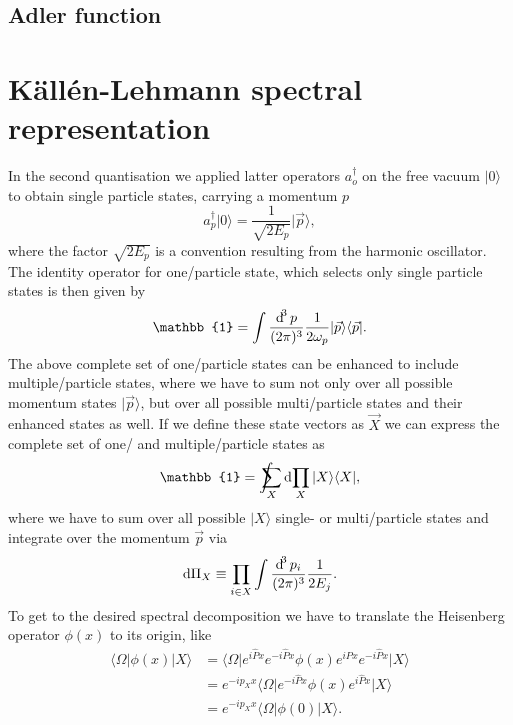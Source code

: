 \documentclass[../../index.tex]{subfiles}
\begin{document}
  \section{Adler function}

  \chapter{Källén-Lehmann spectral representation}
  \label{ch:kallenLehmannSpectralRepresentation}
In the second quantisation we applied latter operators $a_o^\dagger$ on the free
vacuum $\vert 0 \rangle$ to obtain single particle states, carrying a momentum
$p$
\begin{equation}
  a_p^\dagger \vert 0 \rangle = \frac{1}{\sqrt{2 E_p}}\vert \vec p \rangle,
\end{equation}
where the factor $\sqrt{2 E_p}$ is a convention resulting from the harmonic
oscillator. The identity operator for one\-/particle state, which selects only
single particle states is then given by
\begin{equation}
  \mathbb{1} = \int \frac{\dif^3 p}{(2\pi)^3} \frac{1}{2\omega_p} \vert \vec p \rangle \langle \vec p \vert.
\end{equation}
The above complete set of one\-/particle states can be enhanced to include
multiple\-/particle states, where we have to sum not only over all possible
momentum states $\vert \vec p \rangle$, but over all possible multi\-/particle
states and their enhanced states as well. If we define these state vectors as
$\vec X$ we can express the complete set of one\-/ and multiple\-/particle
states as
\begin{equation}
  \mathbb{1} = \intsum_{X} \dif \prod_X \vert X \rangle \langle  X \vert,
\end{equation}
where we have to sum over all possible $\vert X \rangle$ single- or
multi\-/particle states and integrate over the momentum $\vec p$ via
\begin{equation}
  \dif \Pi_X \equiv \prod_{i \in X} \int \frac{\dif^3 p_i}{(2\pi)^3} \frac{1}{2 E_j}.
\end{equation}
To get to the desired spectral decomposition we have to translate the Heisenberg
operator $\phi(x)$ to its origin, like
\begin{equation}
  \begin{split}
    \langle \Omega \vert \phi(x) \vert X \rangle
    &=  \langle \Omega \vert e^{i \hat P x}e^{-i \hat P x} \phi(x) e^{i \hat P x}e^{-i \hat P x} \vert X \rangle \\
    &= e^{-i p_X x} \langle \Omega \vert e^{-i \hat P x} \phi(x) e^{i \hat P x} \vert X \rangle \\
    &= e^{-i p_X x} \langle \Omega \vert \phi(0) \vert X \rangle.
  \end{split}
\end{equation}
\end{document}
